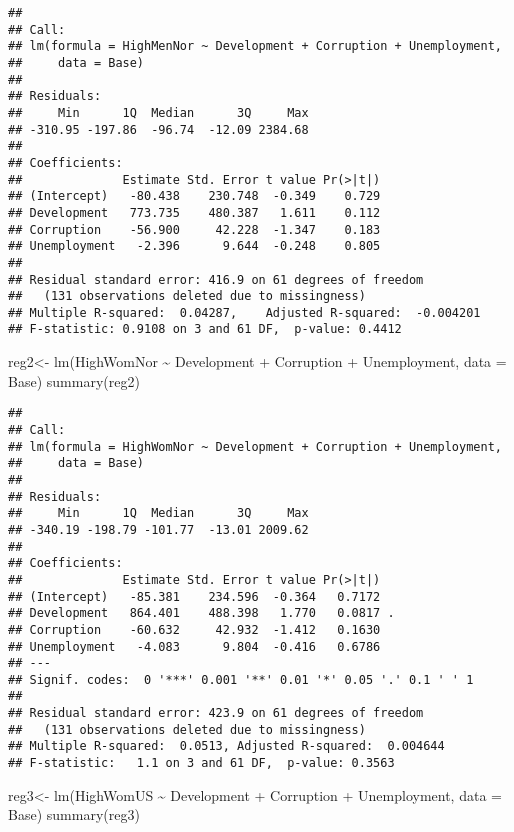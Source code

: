 \documentclass[
]{article}
\newenvironment{Shaded}{\begin{snugshade}}{\end{snugshade}}
\newcommand{\AttributeTok}[1]{\textcolor[rgb]{0.77,0.63,0.00}{#1}}
\newcommand{\FunctionTok}[1]{\textcolor[rgb]{0.00,0.00,0.00}{#1}}
\newcommand{\NormalTok}[1]{#1}
\newcommand{\OtherTok}[1]{\textcolor[rgb]{0.56,0.35,0.01}{#1}}
\newcommand{\SpecialCharTok}[1]{\textcolor[rgb]{0.00,0.00,0.00}{#1}}
\begin{document}
\begin{verbatim}
## 
## Call:
## lm(formula = HighMenNor ~ Development + Corruption + Unemployment, 
##     data = Base)
## 
## Residuals:
##     Min      1Q  Median      3Q     Max 
## -310.95 -197.86  -96.74  -12.09 2384.68 
## 
## Coefficients:
##              Estimate Std. Error t value Pr(>|t|)
## (Intercept)   -80.438    230.748  -0.349    0.729
## Development   773.735    480.387   1.611    0.112
## Corruption    -56.900     42.228  -1.347    0.183
## Unemployment   -2.396      9.644  -0.248    0.805
## 
## Residual standard error: 416.9 on 61 degrees of freedom
##   (131 observations deleted due to missingness)
## Multiple R-squared:  0.04287,    Adjusted R-squared:  -0.004201 
## F-statistic: 0.9108 on 3 and 61 DF,  p-value: 0.4412
\end{verbatim}

\begin{Shaded}
\begin{Highlighting}[]
\NormalTok{reg2}\OtherTok{\textless{}{-}} \FunctionTok{lm}\NormalTok{(HighWomNor }\SpecialCharTok{\textasciitilde{}}\NormalTok{ Development }\SpecialCharTok{+}\NormalTok{ Corruption }\SpecialCharTok{+}\NormalTok{ Unemployment, }\AttributeTok{data =}\NormalTok{ Base)}
\FunctionTok{summary}\NormalTok{(reg2)}
\end{Highlighting}
\end{Shaded}

\begin{verbatim}
## 
## Call:
## lm(formula = HighWomNor ~ Development + Corruption + Unemployment, 
##     data = Base)
## 
## Residuals:
##     Min      1Q  Median      3Q     Max 
## -340.19 -198.79 -101.77  -13.01 2009.62 
## 
## Coefficients:
##              Estimate Std. Error t value Pr(>|t|)  
## (Intercept)   -85.381    234.596  -0.364   0.7172  
## Development   864.401    488.398   1.770   0.0817 .
## Corruption    -60.632     42.932  -1.412   0.1630  
## Unemployment   -4.083      9.804  -0.416   0.6786  
## ---
## Signif. codes:  0 '***' 0.001 '**' 0.01 '*' 0.05 '.' 0.1 ' ' 1
## 
## Residual standard error: 423.9 on 61 degrees of freedom
##   (131 observations deleted due to missingness)
## Multiple R-squared:  0.0513, Adjusted R-squared:  0.004644 
## F-statistic:   1.1 on 3 and 61 DF,  p-value: 0.3563
\end{verbatim}

\begin{Shaded}
\begin{Highlighting}[]
\NormalTok{reg3}\OtherTok{\textless{}{-}} \FunctionTok{lm}\NormalTok{(HighWomUS }\SpecialCharTok{\textasciitilde{}}\NormalTok{ Development }\SpecialCharTok{+}\NormalTok{ Corruption }\SpecialCharTok{+}\NormalTok{ Unemployment, }\AttributeTok{data =}\NormalTok{ Base)}
\FunctionTok{summary}\NormalTok{(reg3)}
\end{Highlighting}
\end{Shaded}
\end{document}
